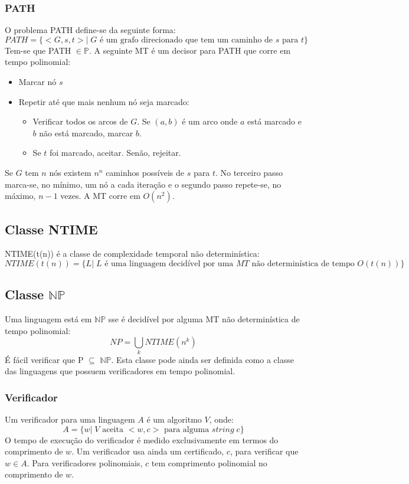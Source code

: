 \documentclass[10pt,a4paper]{report}
\begin{document}
\subsubsection{PATH}
O problema PATH define-se da seguinte forma:
$$
PATH = \{<G,s,t> |\; G \text{ é um grafo direcionado que tem um caminho de } s \text{ para } t\}
$$
Tem-se que PATH $\in \mathbb{P}$. A seguinte MT é um decisor para PATH que corre em tempo polinomial:
\begin{itemize}
\item Marcar nó $s$
\item Repetir até que mais nenhum nó seja marcado:
\begin{itemize}
\item Verificar todos os arcos de $G$. Se $(a,b)$ é um arco onde $a$ está marcado e $b$ não está marcado, marcar $b$.
\item Se $t$ foi marcado, aceitar. Senão, rejeitar.
\end{itemize}
\end{itemize}
Se $G$ tem $n$ nós existem $n^n$ caminhos possíveis de $s$ para $t$. No terceiro passo marca-se, no mínimo, um nó a cada iteração e o segundo passo repete-se, no máximo, $n-1$ vezes. A MT corre em $O(n^2)$.
\subsection{Classe NTIME}
NTIME(t(n)) é a classe de complexidade temporal não determinística:
$$
NTIME(t(n)) = \{L |\; L \text{ é uma linguagem decidível por uma } MT \text{ não determinística de tempo } O(t(n))\}
$$
\subsection{Classe $\mathbb{N}\mathbb{P}$}
Uma linguagem está em $\mathbb{N}\mathbb{P}$ sse é decidível por alguma MT não determinística de tempo polinomial:
$$
NP = \bigcup_k NTIME(n^k)
$$
É fácil verificar que P $\subseteq$ $\mathbb{N}\mathbb{P}$. Esta classe pode ainda ser definida como a classe das linguagens que possuem verificadores em tempo polinomial.
\subsubsection{Verificador}
Um verificador para uma linguagem $A$ é um algoritmo $V$, onde:
$$
A = \{w |\; V \text{ aceita } <w,c> \text{ para alguma } string \; c\}
$$
O tempo de execução do verificador é medido exclusivamente em termos do comprimento de $w$. Um verificador usa ainda um certificado, $c$, para verificar que $w \in A$. Para verificadores polinomiais, $c$ tem comprimento polinomial no comprimento de $w$.
\end{document}
